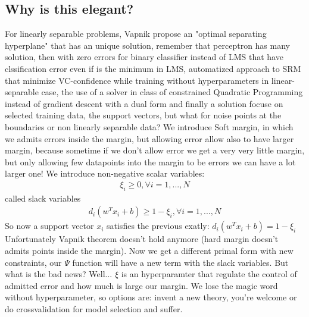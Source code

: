 \documentclass[12pt]{book}
\begin{document}
\subsection{Why is this elegant?}
For linearly separable problems, Vapnik propose an "optimal separating hyperplane" that has an unique solution, remember that perceptron has many solution, then with zero errors for binary classifier instead of LMS that have clssification error even if is the minimum in LMS, automatized approach to SRM that minimize VC-confidence while training without hyperparameters in linear-separable case, the use of a solver in class of constrained Quadratic Programming instead of gradient descent with a dual form and finally a solution focuse on selected training data, the support vectors, but what for noise points at the boundaries or non linearly separable data?\newline
We introduce Soft margin, in which we admits errors inside the margin, but allowing error allow also to have larger margin, because sometime if we don't allow error we get a very very little margin, but only allowing few datapoints into the margin to be errors we can have a lot larger one!
\newline
We introduce non-negative scalar variables:
\begin{equation}
	\begin{aligned}
		\xi_i \geq 0, \forall i = 1,...,N 
	\end{aligned}
\end{equation}
called slack variables
\newline
\begin{equation}
	\begin{aligned}
		d_i(w^Tx_i + b) \geq 1 - \xi_i, \forall i = 1,...,N
	\end{aligned}
\end{equation}
So now a support vector $x_i$ satisfies the previous exatly: $d_i(w^Tx_i + b) = 1 - \xi_i$
\newline
Unfortunately Vapnik theorem doesn't hold anymore (hard margin doesn't admits points inside the margin).\newline
Now we get a different primal form with new constraints, our $\Psi$ function will have a new term with the slack variables.\newline
But what is the bad news? Well... $\xi$ is an hyperparamter that regulate the control of admitted error and how much is large our margin. We lose the magic word without hyperparameter, so options are: invent a new theory, you're welcome or do crossvalidation for model selection and suffer.
\newline
\end{document}
